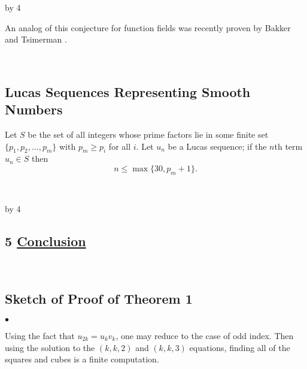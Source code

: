 \documentclass[12pt]{scrartcl}
\newenvironment{citemize}{
\begin{list}{$\bullet$}{\setlength{\itemsep}{0pt} \setlength{\rightmargin}{0pt} \setlength{\leftmargin}{0.5\labelwidth} \setlength{\topsep}{0pt}}
}{\end{list}}
\def\anzspalten{4}
\newlength{\kastenwidth}
\newenvironment{kasten}{%
  \begin{lrbox}{\dummybox}%
    \begin{minipage}{0.96\linewidth}}%
    {\end{minipage}%
  \end{lrbox}%
  \raisebox{-\depth}{\psshadowbox[framesep=1em]{\usebox{\dummybox}}}\\[0.5em]}
\newenvironment{spalte}{%
  \setlength\kastenwidth{1.2\textwidth}
  \divide\kastenwidth by \anzspalten
  \begin{minipage}[t]{\kastenwidth}}{\end{minipage}\hfill}
\begin{document}
\begin{lrbox}{\spalten}
{\begin{spalte}
\begin{kasten}
An analog of this conjecture for function fields was recently proven by Bakker and Tsimerman \cite{bakker01}.

\end{kasten}

\begin{kasten}

\subsection*{ \color{blue} Lucas Sequences Representing Smooth Numbers}

Let $S$ be the set of all integers whose prime factors lie in some finite set $\{p_1,p_2,...,p_m\}$ with $p_m \geq p_i$ for all $i$.  Let $u_n$ be a Lucas sequence; if the $n$th term $u_n \in S$ then
\[ n \leq \max\{30, p_m +1 \}. \]

\end{kasten}




\end{spalte}
    \begin{spalte}
\vspace{-2.81in}

\begin{kasten}
\section*{5 \hspace{0.1cm} {\color{red} 
\underline{Conclusion}}}
\end{kasten}

\begin{kasten}

\subsection*{\color{blue} Sketch of Proof of Theorem 1}

\begin{citemize}

\item Using the fact that $u_{2k} = u_kv_k$, one may reduce to the case of odd index.  Then using the solution to the $(k,k,2)$ and $(k,k, 3)$ equations, finding all of the squares and cubes is a finite computation.


\end{citemize}
\end{kasten}
\end{spalte}}
\end{lrbox}
\end{document}
